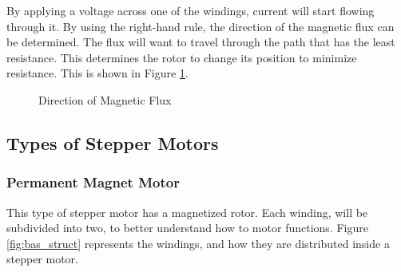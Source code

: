 By applying a voltage across one of the windings, current will start flowing through it. By using the right-hand rule, the direction of the magnetic flux can be determined. The flux will want to travel through the path that has the least resistance. This determines the rotor to change its position to minimize resistance. This is shown in Figure \ref{fig:flux}.

\begin{figure}[htp]
	\centering
	\hfill
	\caption{Direction of Magnetic Flux}
	\label{fig:flux}
\end{figure}

\subsection{Types of Stepper Motors}
\subsubsection{Permanent Magnet Motor}
This type of stepper motor has a magnetized rotor. Each winding, will be subdivided into two, to better understand how to motor functions. Figure \ref{fig:bas_struct} represents the windings, and how they are distributed inside a stepper motor.

